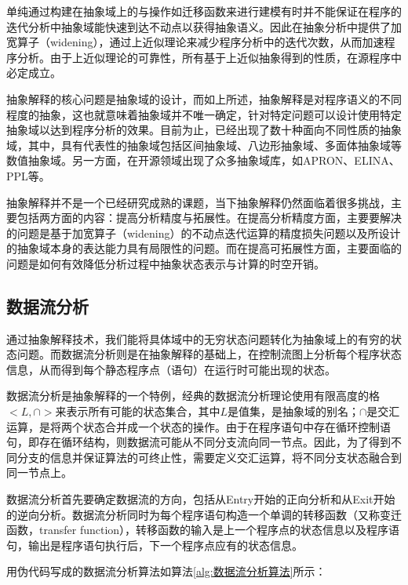  单纯通过构建在抽象域上的与操作如迁移函数来进行建模有时并不能保证在程序的迭代分析中抽象域能快速到达不动点以获得抽象语义。因此在抽象分析中提供了加宽算子（widening），通过上近似理论来减少程序分析中的迭代次数，从而加速程序分析。由于上近似理论的可靠性，所有基于上近似抽象得到的性质，在源程序中必定成立。
 
 抽象解释的核心问题是抽象域的设计，而如上所述，抽象解释是对程序语义的不同程度的抽象，这也就意味着抽象域并不唯一确定，针对特定问题可以设计使用特定抽象域以达到程序分析的效果。目前为止，已经出现了数十种面向不同性质的抽象域，其中，具有代表性的抽象域包括区间抽象域、八边形抽象域、多面体抽象域等数值抽象域\cite{张健2019程序分析研究进展}。另一方面，在开源领域出现了众多抽象域库，如APRON\cite{jeannet2009apron}、ELINA\cite{singh2017practical}、PPL\cite{bagnara2006parma}等。
 
 抽象解释并不是一个已经研究成熟的课题，当下抽象解释仍然面临着很多挑战，主要包括两方面的内容：提高分析精度与拓展性。在提高分析精度方面，主要要解决的问题是基于加宽算子（widening）的不动点迭代运算的精度损失问题以及所设计的抽象域本身的表达能力具有局限性的问题。而在提高可拓展性方面，主要面临的问题是如何有效降低分析过程中抽象状态表示与计算的时空开销。
 
 \subsection{数据流分析}
 
 通过抽象解释技术，我们能将具体域中的无穷状态问题转化为抽象域上的有穷的状态问题。而数据流分析则是在抽象解释的基础上，在控制流图上分析每个程序状态信息，从而得到每个静态程序点（语句）在运行时可能出现的状态。
 
 数据流分析是抽象解释的一个特例，经典的数据流分析理论\cite{aho1986compilers}使用有限高度的格$ <L,∩> $来表示所有可能的状态集合，其中$ L $是值集，是抽象域的别名；$ ∩ $是交汇运算，是将两个状态合并成一个状态的操作。由于在程序语句中存在循环控制语句，即存在循环结构，则数据流可能从不同分支流向同一节点。因此，为了得到不同分支的信息并保证算法的可终止性，需要定义交汇运算，将不同分支状态融合到同一节点上。
 
 数据流分析首先要确定数据流的方向，包括从Entry开始的正向分析和从Exit开始的逆向分析。数据流分析同时为每个程序语句构造一个单调的转移函数（又称变迁函数，transfer function），转移函数的输入是上一个程序点的状态信息以及程序语句，输出是程序语句执行后，下一个程序点应有的状态信息。
 
 用伪代码写成的数据流分析算法\cite{cooper2004iterative}如算法\ref{alg:数据流分析算法}所示：
 

